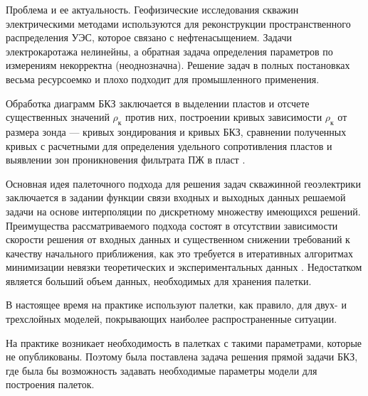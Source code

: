 
Проблема и ее актуальность. Геофизические исследования скважин
электрическими методами используются для
реконструкции пространственного распределения
УЭС, которое связано с нефтенасыщением.
Задачи электрокаротажа нелинейны, а обратная
задача определения параметров по измерениям
некорректна (неоднозначна). Решение задач в
полных постановках весьма ресурсоемко и плохо
подходит для промышленного применения.

Обработка диаграмм БКЗ заключается в выделении пластов
и отсчете существенных значений $\rho_\text {к}$ против них, построении
кривых зависимости $\rho_\text {к}$ от размера зонда --- кривых зондирования
и кривых БКЗ, сравнении полученных кривых с расчетными
для определения удельного сопротивления пластов и выявлении
зон проникновения фильтрата ПЖ в пласт \cite{valiullin}.

Основная идея палеточного подхода для решения задач скважинной
геоэлектрики заключается в задании функции связи входных
и выходных данных решаемой задачи на основе интерполяции по
дискретному множеству имеющихся решений.
Преимущества рассматриваемого
подхода состоят в отсутствии зависимости скорости
решения от входных данных и существенном снижении требований к
качеству начального приближения, как это требуется в итеративных алгоритмах
минимизации невязки теоретических и экспериментальных данных \cite{palette}.
Недостатком является больший объем данных, необходимых для хранения палетки.

В настоящее
время на практике используют палетки, как правило, для
двух- и трехслойных моделей, покрывающих наиболее
распространенные ситуации.

На практике возникает необходимость в палетках с такими параметрами, которые не опубликованы. Поэтому была поставлена задача решения прямой задачи БКЗ, где была бы возможность задавать необходимые параметры модели для построения палеток.

\clearpage